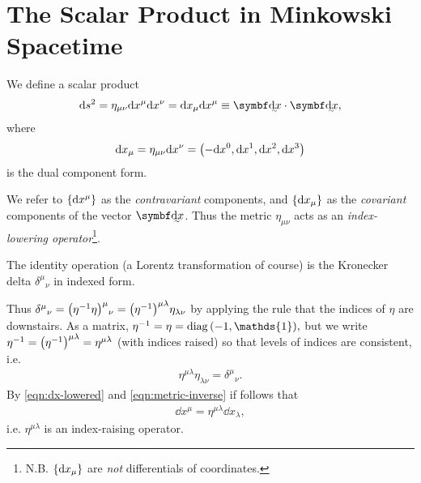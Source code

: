 \section{The Scalar Product in Minkowski Spacetime}

We define a scalar product
\begin{align}
	\dd s^2 = \eta_{\mu\nu} \dd x^\mu \dd x^\nu = \dd x_\mu \dd x^\mu \equiv \ts{\dd x} \cdot \ts{\dd x},
\end{align}
where 
\begin{align}
	\dd x_\mu = \eta_{\mu\nu} \dd x^\nu = \qty(- \dd x^0, \dd x^1, \dd x^2, \dd x^3 ) \label{eqn:dx-lowered}
\end{align}
is the dual component form.

We refer to $\qty{\dd x^\mu}$ as the \textit{contravariant} components, and $\qty{\dd x_\mu}$ as the \textit{covariant} components of the vector $\ts{ \dd x}$.
Thus the metric $\eta_{\mu\nu}$ acts as an \textit{index-lowering operator}\footnote{N.B. $\qty{ \dd x_\mu }$ are \textit{not} differentials of coordinates.}.

The identity operation (a Lorentz transformation of course) is the Kronecker delta $\delta^\mu{}_\nu$ in indexed form.

Thus $\delta^\mu{}_\nu = \qty(\eta^{-1} \eta)^\mu{}_\nu = \qty(\eta^{-1})^{\mu\lambda} \eta_{\lambda\nu}$ by applying the rule that the indices of $\eta$ are downstairs.
As a matrix, $\eta^{-1} = \eta = \operatorname{diag}\qty(-1, \mathds{1}),$
but we write $\eta^{-1} = \qty(\eta^{-1})^{\mu\lambda} = \eta^{\mu\lambda}$ (with indices raised) so that levels of indices are consistent, i.e.
\begin{align}
	\eta^{\mu\lambda} \eta_{\lambda \nu} = \delta^\mu{}_\nu.
	\label{eqn:metric-inverse}
\end{align}
By \eqref{eqn:dx-lowered} and \eqref{eqn:metric-inverse} if follows that
\begin{align}
	\dd x^\mu = \eta^{\mu\lambda} \dd x_\lambda, 
	\label{eqn:eta-raising}
\end{align}
i.e. $\eta^{\mu\lambda}$ is an index-raising operator.

